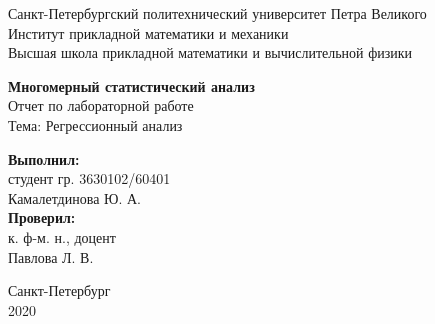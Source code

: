 \begin{titlepage}

\begin{center}
\large{Санкт-Петербургский политехнический университет Петра Великого\\
Институт прикладной математики и механики\\
Высшая школа прикладной математики и вычислительной физики\\}
\end{center}


\vspace{4cm}

\begin{center}
{\huge {\textbf{Многомерный статистический анализ}}}\\

\bigskip 
\large{{Отчет по лабораторной работе} \\
Тема: {Регрессионный анализ}}
\end{center}

\vspace{2.5cm}

\begin{flushleft}
    \begin{minipage}{0.35\textwidth}
        \textbf{Выполнил:} \\
        студент гр. 3630102/60401 \\ {Камалетдинова Ю. А.} \\ 

        \vspace{0.5cm} 
        \textbf{Проверил:} \\
        к. ф-м. н., доцент \\ {Павлова Л. В.}
        \vspace{1cm}
    \end{minipage}

\end{flushleft}

\vspace{0.5cm}

\begin{center}
Санкт-Петербург\\
2020
\end{center}

\end{titlepage}
